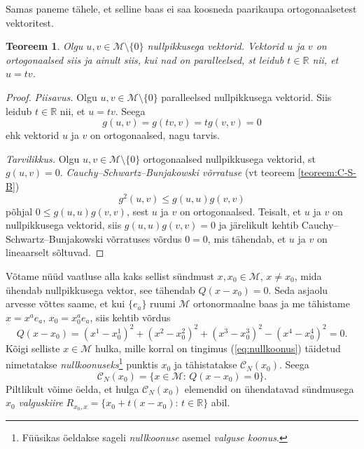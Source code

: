 \documentclass[12pt,a4paper,oneside]{article}
\theoremstyle{plain}
\newtheorem{teoreem}{Teoreem}[section]
\theoremstyle{definition}
\numberwithin{equation}{section}
\def\R{{\mathbb R}}
\def\M{{\mathcal M}}
\begin{document}
Samas paneme tähele, et selline baas ei saa koosneda paarikaupa 
ortogonaalsetest vektoritest.
\begin{teoreem}
Olgu $u, v \in \M \setminus \{0\}$ nullpikkusega vektorid. Vektorid 
$u$ ja $v$ on ortogonaalsed siis ja ainult siis, kui nad on 
paralleelsed, st leidub $t \in \R$ nii, et $u = tv$.
\end{teoreem}
\begin{proof}
\emph{Piisavus.} Olgu $u, v \in \M \setminus \{0\}$ paralleelsed 
nullpikkusega vektorid. Siis leidub $t \in \R$ nii, et $u = tv$. 
Seega
\[g\left(u, v\right) = g \left(tv, v\right) = 
t g \left(v, v\right) = 0\]
ehk vektorid $u$ ja $v$ on ortogonaalsed, nagu tarvis.

\emph{Tarvilikkus.} Olgu $u, v \in \M \setminus \{0\}$ ortogonaalsed 
nullpikkusega vektorid, st $g \left(u, v\right) = 0$. 
\emph{Cauchy--Schwartz--Bunjakowski võrratuse} (vt 
teoreem \ref{teoreem:C-S-B}) 
\[g^2 \left(u, v \right) \leq 
g \left(u, u \right) g \left(v, v \right)\] põhjal 
$0 \leq g \left(u, u \right) g \left(v, v \right)$, sest $u$ ja $v$ 
on ortogonaalsed. Teisalt, et $u$ ja $v$ on nullpikkusega vektorid, 
siis $g \left(u, u \right) g \left(v, v \right) = 0$ ja järelikult 
kehtib Cauchy--Schwartz--Bunjakowski võrratuses võrdus $0 = 0$, mis 
tähendab, et $u$ ja $v$ on lineaarselt sõltuvad.
\end{proof}

Võtame nüüd vaatluse alla kaks sellist sündmust $x, x_0 \in \M$, 
$x \neq x_0$, mida ühendab nullpikkusega vektor, see tähendab 
$Q \left(x- x_0\right) = 0$. Seda asjaolu arvesse võttes saame, 
et kui $\{e_a\}$ ruumi $\M$ ortonormaalne baas ja me tähistame 
$x = x^a e_a$, $x_0 = x_0^a e_a$, siis kehtib võrdus
\begin{equation} \label{eq:nullkoonus}
Q \left(x - x_0\right) = \left(x^1 - x_0^1\right)^2 + 
\left(x^2 - x_0^2\right)^2 + \left(x^3 - x_0^3\right)^2 - 
\left(x^4 - x_0^4\right)^2 = 0.
\end{equation}
Kõigi selliste $x \in \M$ hulka, mille korral on tingimus 
(\ref{eq:nullkoonus}) täidetud nimetatakse \emph{nullkoonuseks}\footnote{
Füüsikas öeldakse sageli \emph{nullkoonuse} asemel 
\emph{valguse koonus}.} punktis $x_0$ ja tähistatakse 
$\mathcal{C}_N\left(x_0\right)$. Seega 
\[\mathcal{C}_N\left(x_0\right) = \{x \in \M \colon\, Q \left(x- x_0\right) 
= 0 \}.\]
Piltlikult võime öelda, et hulga $\mathcal{C}_N\left(x_0\right)$ 
elemendid on ühendatavad sündmusega $x_0$ \emph{valguskiire} 
$R_{x_0, x} = \{x_0 + t\left(x - x_0\right) \colon\, t \in \R \}$ abil.
\end{document}
